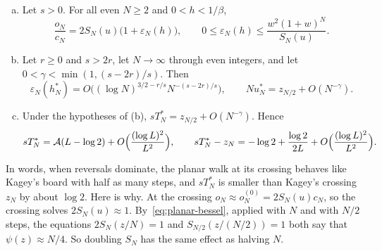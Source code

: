 \begin{theorem}\label{thm:planar-rev}
\begin{enumerate}[(a)]
\item Let $s>0$. For all even $N\ge2$ and $0<h<1/\beta$,
\[
 \frac{o_N}{c_N}=2S_N(u)\bigl(1+\varepsilon_N(h)\bigr),\qquad
 0\le\varepsilon_N(h)\le\frac{w^2(1+w)^N}{S_N(u)}.
\]
\item Let $r\ge0$ and $s>2r$, let $N\to\infty$ through even integers, and let
$0<\gamma<\min(1,(s-2r)/s)$. Then
\[
 \varepsilon_N(h^*_N)=O\bigl((\log N)^{3/2-r/s}N^{-(s-2r)/s}\bigr),\qquad
 Nu^*_N=z_{N/2}+O(N^{-\gamma}).
\]
\item Under the hypotheses of (b), $sT^*_N=z_{N/2}+O(N^{-\gamma})$. Hence
\[
 sT^*_N=\mathcal A(L-\log2)+O\Bigl(\frac{(\log L)^2}{L^2}\Bigr),\qquad
 sT^*_N-z_N=-\log2+\frac{\log2}{2L}+O\Bigl(\frac{(\log L)^2}{L^2}\Bigr).
\]
\end{enumerate}
\end{theorem}

In words, when reversals dominate, the planar walk at its crossing behaves like
Kagey's board with half as many steps, and $sT^*_N$ is smaller than Kagey's
crossing $z_N$ by about $\log2$. Here is why. At the crossing $o_N\approx
o^{(0)}_N=2S_N(u)c_N$, so the crossing solves $2S_N(u)\approx1$.
By~\eqref{eq:planar-bessel}, applied with $N$ and with $N/2$ steps, the
equations $2S_N(z/N)=1$ and $S_{N/2}(z/(N/2))=1$ both say that
$\psi(z)\approx N/4$. So doubling $S_N$ has the same effect as halving $N$.

